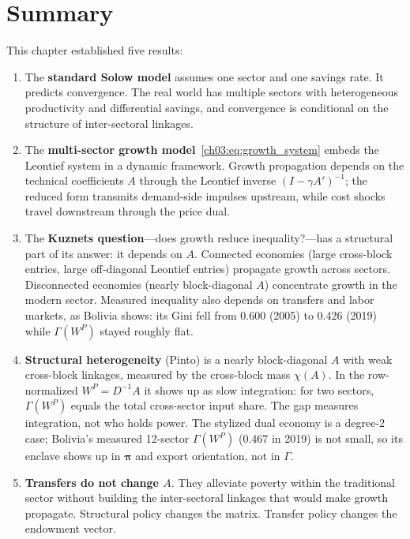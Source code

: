 \documentclass[../structural_economics_book.tex]{subfiles}
\begin{document}
\section{Summary}
\label{ch03:sec:summary}

This chapter established five results:

\begin{enumerate}
\item The \textbf{standard Solow model} assumes one sector and one savings rate. It predicts convergence. The real world has multiple sectors with heterogeneous productivity and differential savings, and convergence is conditional on the structure of inter-sectoral linkages.

\item The \textbf{multi-sector growth model}~\eqref{ch03:eq:growth_system} embeds the Leontief system in a dynamic framework. Growth propagation depends on the technical coefficients $A$ through the Leontief inverse $(I - \gamma A')^{-1}$; the reduced form transmits demand-side impulses upstream, while cost shocks travel downstream through the price dual.

\item The \textbf{Kuznets question}---does growth reduce inequality?---has a structural part of its answer: it depends on $A$. Connected economies (large cross-block entries, large off-diagonal Leontief entries) propagate growth across sectors. Disconnected economies (nearly block-diagonal $A$) concentrate growth in the modern sector. Measured inequality also depends on transfers and labor markets, as Bolivia shows: its Gini fell from 0.600 (2005) to 0.426 (2019) while $\Gamma(W^P)$ stayed roughly flat.

\item \textbf{Structural heterogeneity} (Pinto) is a nearly block-diagonal $A$ with weak cross-block linkages, measured by the cross-block mass $\chi(A)$. In the row-normalized $W^P = D^{-1}A$ it shows up as slow integration: for two sectors, $\Gamma(W^P)$ equals the total cross-sector input share. The gap measures integration, not who holds power. The stylized dual economy is a degree-2 case; Bolivia's measured 12-sector $\Gamma(W^P)$ (0.467 in 2019) is not small, so its enclave shows up in $\boldsymbol{\pi}$ and export orientation, not in $\Gamma$.

\item \textbf{Transfers do not change $A$}. They alleviate poverty within the traditional sector without building the inter-sectoral linkages that would make growth propagate. Structural policy changes the matrix. Transfer policy changes the endowment vector.
\end{enumerate}
\end{document}
